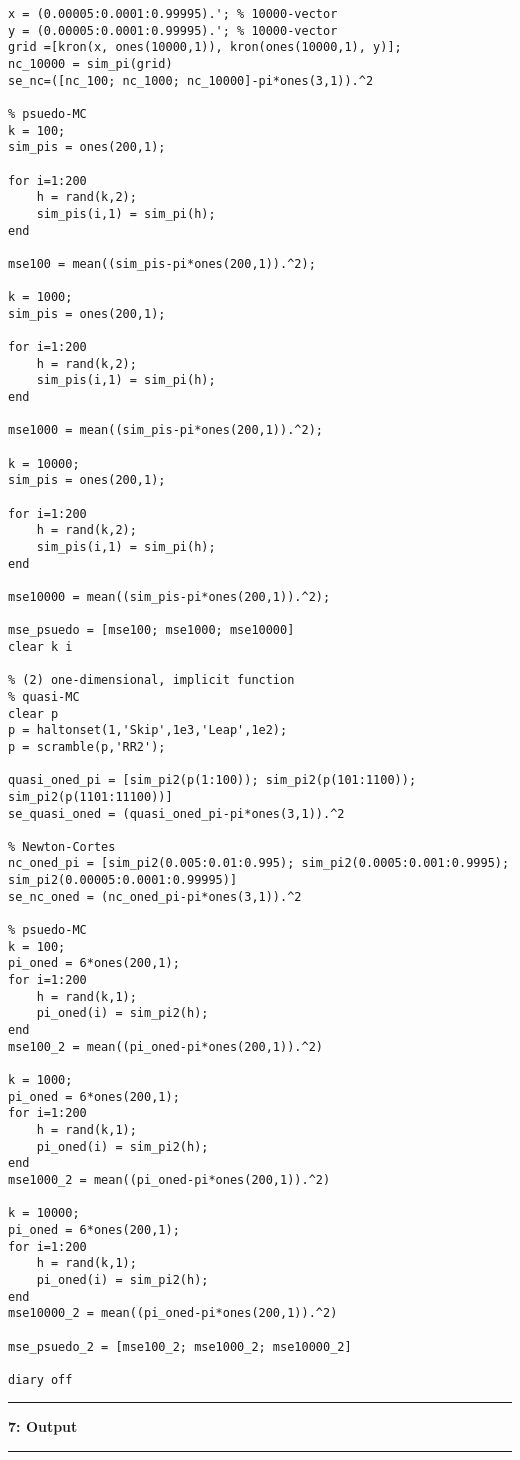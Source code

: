 \documentclass[10pt]{article}
\newcommand\question[2]{\vspace{.25in}\hrule\textbf{#1: #2}\vspace{.5em}\hrule\vspace{.10in}}
\begin{document}
\begin{tiny}
\begin{verbatim}
x = (0.00005:0.0001:0.99995).'; % 10000-vector
y = (0.00005:0.0001:0.99995).'; % 10000-vector
grid =[kron(x, ones(10000,1)), kron(ones(10000,1), y)];
nc_10000 = sim_pi(grid)
se_nc=([nc_100; nc_1000; nc_10000]-pi*ones(3,1)).^2

% psuedo-MC
k = 100;
sim_pis = ones(200,1);

for i=1:200
    h = rand(k,2);
    sim_pis(i,1) = sim_pi(h);
end

mse100 = mean((sim_pis-pi*ones(200,1)).^2);

k = 1000;
sim_pis = ones(200,1);

for i=1:200
    h = rand(k,2);
    sim_pis(i,1) = sim_pi(h);
end

mse1000 = mean((sim_pis-pi*ones(200,1)).^2);

k = 10000;
sim_pis = ones(200,1);

for i=1:200
    h = rand(k,2);
    sim_pis(i,1) = sim_pi(h);
end

mse10000 = mean((sim_pis-pi*ones(200,1)).^2);

mse_psuedo = [mse100; mse1000; mse10000]
clear k i

% (2) one-dimensional, implicit function
% quasi-MC
clear p
p = haltonset(1,'Skip',1e3,'Leap',1e2);
p = scramble(p,'RR2');

quasi_oned_pi = [sim_pi2(p(1:100)); sim_pi2(p(101:1100)); sim_pi2(p(1101:11100))]
se_quasi_oned = (quasi_oned_pi-pi*ones(3,1)).^2

% Newton-Cortes
nc_oned_pi = [sim_pi2(0.005:0.01:0.995); sim_pi2(0.0005:0.001:0.9995); sim_pi2(0.00005:0.0001:0.99995)]
se_nc_oned = (nc_oned_pi-pi*ones(3,1)).^2

% psuedo-MC
k = 100;
pi_oned = 6*ones(200,1);
for i=1:200
    h = rand(k,1);
    pi_oned(i) = sim_pi2(h);
end
mse100_2 = mean((pi_oned-pi*ones(200,1)).^2)

k = 1000;
pi_oned = 6*ones(200,1);
for i=1:200
    h = rand(k,1);
    pi_oned(i) = sim_pi2(h);
end
mse1000_2 = mean((pi_oned-pi*ones(200,1)).^2)
    
k = 10000;
pi_oned = 6*ones(200,1);
for i=1:200
    h = rand(k,1);
    pi_oned(i) = sim_pi2(h);
end
mse10000_2 = mean((pi_oned-pi*ones(200,1)).^2)

mse_psuedo_2 = [mse100_2; mse1000_2; mse10000_2]

diary off
\end{verbatim}
\end{tiny}
\question{7}{Output}
\end{document}
